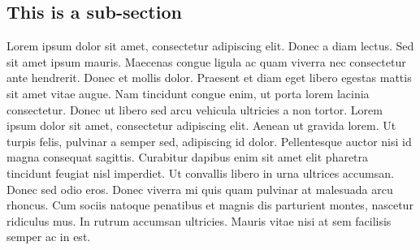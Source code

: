 \subsection{This is a sub-section}
Lorem ipsum dolor sit amet, consectetur adipiscing elit. Donec a diam lectus.
Sed sit amet ipsum mauris. Maecenas congue ligula ac quam viverra nec
consectetur ante hendrerit. Donec et mollis dolor. Praesent et diam eget libero
egestas mattis sit amet vitae augue. Nam tincidunt congue enim, ut porta lorem
lacinia consectetur. Donec ut libero sed arcu vehicula ultricies a non tortor.
Lorem ipsum dolor sit amet, consectetur adipiscing elit. Aenean ut gravida 
lorem. Ut turpis felis, pulvinar a semper sed, adipiscing id dolor.
Pellentesque auctor nisi id magna consequat sagittis. Curabitur dapibus enim
sit amet elit pharetra tincidunt feugiat nisl imperdiet. Ut convallis libero in
urna ultrices accumsan. Donec sed odio eros. Donec viverra mi quis quam
pulvinar at malesuada arcu rhoncus. Cum sociis natoque penatibus et magnis dis
parturient montes, nascetur ridiculus mus. In rutrum accumsan ultricies. Mauris
vitae nisi at sem facilisis semper ac in est.


